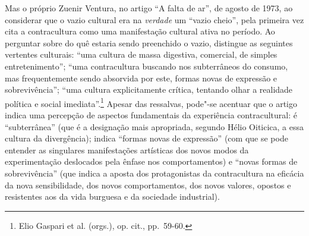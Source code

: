 Mas o próprio Zuenir Ventura, no artigo ``A falta de ar'', de agosto de
1973, ao considerar que o vazio cultural era na \emph{verdade} um
``vazio cheio'', pela primeira vez cita a contracultura como uma
manifestação cultural ativa no período. Ao perguntar sobre do quê
estaria sendo preenchido o vazio, distingue as seguintes vertentes
culturais: ``uma cultura de massa digestiva, comercial, de simples
entretenimento''; ``uma contracultura buscando nos subterrâneos do
consumo, mas frequentemente sendo absorvida por este, formas novas de
expressão e sobrevivência''; ``uma cultura explicitamente crítica,
tentando olhar a realidade política e social imediata''.\footnote{Elio
Gaspari et al. (orgs.), op. cit., pp.~59-60.} Apesar das
ressalvas, pode"-se acentuar que o artigo indica uma percepção de
aspectos fundamentais da experiência contracultural: é ``subterrânea''
(que é a designação mais apropriada, segundo Hélio Oiticica, a essa
cultura da divergência); indica ``formas novas de expressão'' (com que
se pode entender as singulares manifestações artísticas dos novos modos
da experimentação deslocados pela ênfase nos comportamentos) e ``novas
formas de sobrevivência'' (que indica a aposta dos protagonistas da
contracultura na eficácia da nova sensibilidade, dos novos
comportamentos, dos novos valores, opostos e resistentes aos da vida
burguesa e da sociedade industrial).

\asterisc

